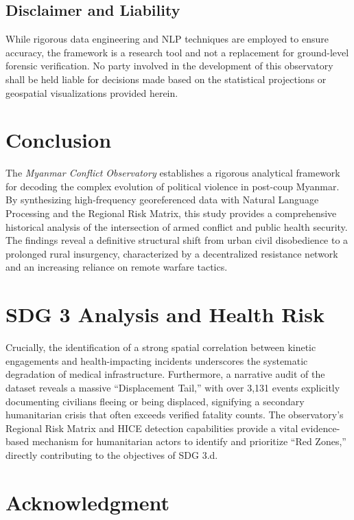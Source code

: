 \documentclass[conference]{IEEEtran}
\begin{document}
\subsection{Disclaimer and Liability}

While rigorous data engineering and NLP techniques are employed to ensure accuracy, the framework is a research tool and not a replacement for ground-level forensic verification. No party involved in the development of this observatory shall be held liable for decisions made based on the statistical projections or geospatial visualizations provided herein.

\section{Conclusion}

The \textit{Myanmar Conflict Observatory} establishes a rigorous analytical framework for decoding the complex evolution of political violence in post-coup Myanmar. By synthesizing high-frequency georeferenced data with Natural Language Processing and the Regional Risk Matrix, this study provides a comprehensive historical analysis of the intersection of armed conflict and public health security. The findings reveal a definitive structural shift from urban civil disobedience to a prolonged rural insurgency, characterized by a decentralized resistance network and an increasing reliance on remote warfare tactics.
\section{SDG 3 Analysis and Health Risk}
\label{sec:sdg3}
Crucially, the identification of a strong spatial correlation between kinetic engagements and health-impacting incidents underscores the systematic degradation of medical infrastructure. Furthermore, a narrative audit of the dataset reveals a massive ``Displacement Tail,'' with over 3,131 events explicitly documenting civilians fleeing or being displaced, signifying a secondary humanitarian crisis that often exceeds verified fatality counts. The observatory's Regional Risk Matrix and HICE detection capabilities provide a vital evidence-based mechanism for humanitarian actors to identify and prioritize ``Red Zones,'' directly contributing to the objectives of SDG 3.d.
\section{Acknowledgment}
\end{document}
